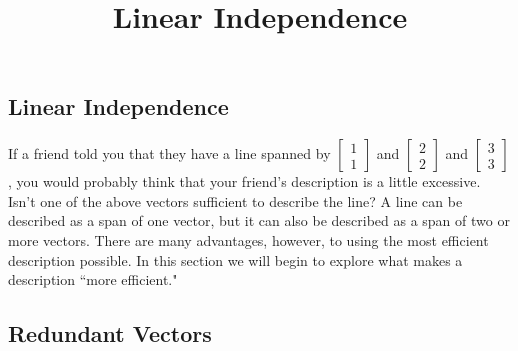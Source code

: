 \documentclass{ximera}
\title{Linear Independence} \license{CC BY-NC-SA 4.0}
\begin{document}
\begin{abstract}
 \end{abstract}
\maketitle

\begin{onlineOnly}
\section*{Linear Independence}
\end{onlineOnly}

If a friend told you that they have a line spanned by $\begin{bmatrix}1\\1\end{bmatrix}$ and $\begin{bmatrix}2\\2\end{bmatrix}$ and $\begin{bmatrix}3\\3\end{bmatrix}$, you would probably think that your friend's description is a little excessive.  Isn't one of the above vectors sufficient to describe the line?  A line can be described as a span of one vector, but it can also be described as a span of two or more vectors.  There are many advantages, however, to using the most efficient description possible.  In this section we will begin to explore what makes a description ``more efficient."
\subsection*{Redundant Vectors}
\end{document}
